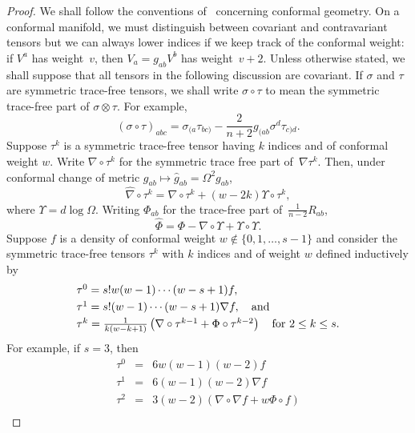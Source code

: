 \documentclass[a4paper,12pt]{amsart}
\begin{document}
\renewcommand{\proofname}{Proof of Theorem~\ref{betterthanexistence}}
\begin{proof}
We shall follow the conventions of~\cite{beg} concerning
conformal geometry.
On a conformal manifold, we must distinguish \mbox{between}
covariant and contravariant tensors but we can always lower indices if we keep
track of the conformal weight: if $V^a$ has weight~$v$, then $V_a=g_{ab}V^b$
has weight~$v+2$. Unless otherwise stated, we shall suppose that all tensors in
the following discussion are covariant. If $\sigma$ and $\tau$ are symmetric
trace-free tensors, we shall write $\sigma\circ\tau$ to mean the symmetric
trace-free part of $\sigma\otimes\tau$. For example,
$$\textstyle(\sigma\circ\tau)_{abc}=
\sigma_{(a}\tau_{bc)}-\frac{2}{n+2}g_{(ab}\sigma^d\tau_{c)d}.$$
Suppose $\tau^k$ is a symmetric trace-free tensor having $k$ indices and of
conformal weight $w$. Write $\nabla\circ\tau^k$ for the symmetric trace free
part of~$\nabla\tau^k$. Then, under conformal change of metric
$g_{ab}\mapsto\hat g_{ab}=\Omega^2g_{ab}$,
\begin{equation}\label{change}
\hat\nabla\circ\tau^k=\nabla\circ\tau^k+(w-2k)\Upsilon\circ\tau^k,
\end{equation}
where $\Upsilon=d\log\Omega$.
Writing $\Phi_{ab}$ for the trace-free part of~$\frac{1}{n-2}R_{ab}$,
\begin{equation}\label{changeinPhi}
\hat\Phi=\Phi-\nabla\circ\Upsilon+\Upsilon\circ\Upsilon.\end{equation}
Suppose $f$ is a density of conformal weight $w\not\in\{0,1,\ldots,s-1\}$
and consider the symmetric trace-free tensors $\tau^k$ with $k$ indices and of
weight $w$ defined inductively by
\begin{equation}\label{defoftau}
\begin{array}l\tau^0=s!w(w-1)\cdots(w-s+1)f,\\[3pt]
\tau^1=s!(w-1)\cdots(w-s+1)\nabla f,\quad\mbox{and}\\[3pt]
\tau^k
=\frac{1}{k(w-k+1)}\left(\nabla\circ\tau^{k-1}+\Phi\circ\tau^{k-2}\right)
\quad\mbox{for }2\leq k\leq s.\end{array}\end{equation}
For example, if $s=3$, then
\begin{equation}\label{tauincasethree}
\begin{array}{rcl}\tau^0&=&6w(w-1)(w-2)f\\[3pt]
\tau^1&=&6(w-1)(w-2)\nabla f\\[3pt]
\tau^2&=&3(w-2)(\nabla\circ\nabla f+w\Phi\circ f)\\[3pt]

\end{array}
\end{equation}
\end{proof}
\end{document}
